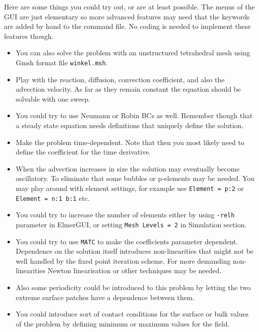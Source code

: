 Here are some things you could try out, or are at least possible. The menus of the GUI are just 
elementary so more advanced features may need that the keywords are added by hand to the 
command file. No coding is needed to implement these features though. 
\begin{itemize}
\item You can also solve the problem with an unstructured tetrahedral mesh 
using Gmsh format file \texttt{winkel.msh}. 
\item Play with the reaction, diffusion, convection coefficient, and also the advection velocity.
As far as they remain constant the equation should be solvable with one sweep.
\item You could try to use Neumann or Robin BCs as well. Remember though that
a steady state equation needs definitions that uniquely define the solution.
\item Make the problem time-dependent. Note that then you most likely need to define the 
coefficient for the time derivative. 
\item When the advection increases in size the solution may eventually become oscillatory.
To eliminate that some bubbles or p-elements may be needed. You may play around with 
element settings, for example use \texttt{Element = p:2} or \texttt{Element = n:1 b:1} etc. 
\item You could try to increase the number of elements either by using \texttt{-relh} 
parameter in ElmerGUI, or setting \texttt{Mesh Levels = 2} in Simulation section.
\item You could try to use \texttt{MATC} to make the coefficients parameter dependent.
Dependence on the solution itself introduces non-linearities that might not be well handled 
by the fixed point iteration scheme. For more demanding non-linearities Newton linearisation or
other techniques may be needed. 
\item Also some periodicity could be introduced to this problem by letting the 
two extreme surface patches have a dependence between them.
\item You could introduce sort of contact conditions for the surface or bulk values 
of the problem by defining minimum or maximum values for the field. 
\end{itemize}


\hfill
\mbox{}






